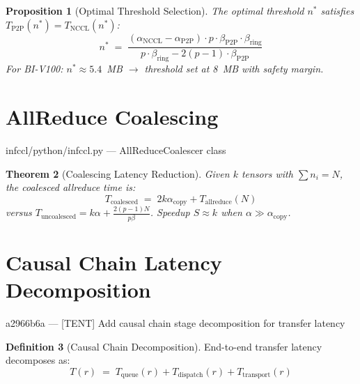 \documentclass[11pt,a4paper,twoside]{article}
\theoremstyle{plain}
\newtheorem{theorem}{Theorem}[section]
\newtheorem{proposition}[theorem]{Proposition}
\theoremstyle{definition}
\newtheorem{definition}[theorem]{Definition}
\theoremstyle{remark}
\begin{document}
\begin{proposition}[Optimal Threshold Selection]
\label{prop:threshold}
The optimal threshold $n^*$ satisfies $T_{\text{P2P}}(n^*) = T_{\text{NCCL}}(n^*)$:
\begin{equation}
  n^* \;=\; \frac{(\alpha_{\text{NCCL}} - \alpha_{\text{P2P}}) \cdot p \cdot
  \beta_{\text{P2P}} \cdot \beta_{\text{ring}}}
  {p \cdot \beta_{\text{ring}} - 2(p-1) \cdot \beta_{\text{P2P}}}
\end{equation}
For BI-V100: $n^* \approx 5.4$~MB $\to$ threshold set at 8~MB with safety margin.
\end{proposition}


\section{AllReduce Coalescing}
\label{sec:coalesce}

\begin{commitbox}{infccl/python/infccl.py --- AllReduceCoalescer class}
\end{commitbox}

\begin{theorem}[Coalescing Latency Reduction]
\label{thm:coalesce}
Given $k$ tensors with $\sum n_i = N$, the coalesced allreduce time is:
\begin{equation}
  T_{\text{coalesced}} \;=\; 2k\alpha_{\text{copy}} + T_{\text{allreduce}}(N)
\end{equation}
versus $T_{\text{uncoalesced}} = k\alpha + \frac{2(p-1)N}{p\beta}$.
Speedup $S \approx k$ when $\alpha \gg \alpha_{\text{copy}}$.
\end{theorem}


\section{Causal Chain Latency Decomposition}
\label{sec:causal}

\begin{commitbox}{a2966b6a --- [TENT] Add causal chain stage decomposition for
transfer latency}
\end{commitbox}

\begin{definition}[Causal Chain Decomposition]
\label{def:causal-chain}
End-to-end transfer latency decomposes as:
\begin{equation}
  T(r) \;=\; T_{\text{queue}}(r) + T_{\text{dispatch}}(r) + T_{\text{transport}}(r)
\end{equation}
\end{definition}
\end{document}
